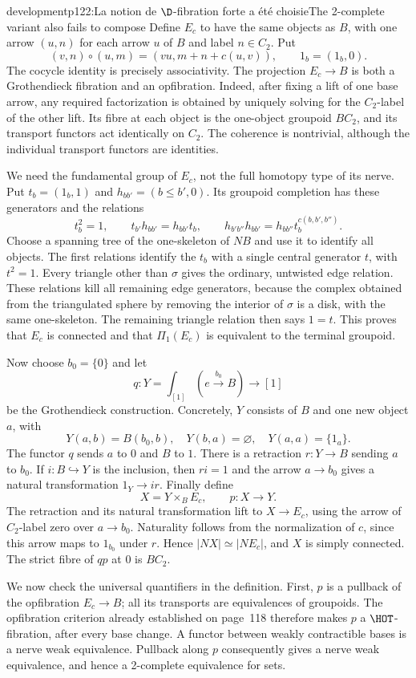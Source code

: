 \begin{dcomment}{development}{p122:La notion de $\D$-fibration forte a été choisie}{The 2-complete variant also fails to compose}
Define $E_c$ to have the same objects as $B$, with one arrow $(u,n)$ for each arrow $u$ of $B$ and label $n\in C_2$. Put
\[
 (v,n)\circ(u,m)=(vu,m+n+c(u,v)),
 \qquad 1_b=(1_b,0).
\]
The cocycle identity is precisely associativity. The projection $E_c\to B$ is both a Grothendieck fibration and an opfibration. Indeed, after fixing a lift of one base arrow, any required factorization is obtained by uniquely solving for the $C_2$-label of the other lift. Its fibre at each object is the one-object groupoid $BC_2$, and its transport functors act identically on $C_2$. The coherence is nontrivial, although the individual transport functors are identities.

We need the fundamental group of $E_c$, not the full homotopy type of its nerve. Put $t_b=(1_b,1)$ and $h_{bb'}=(b\leq b',0)$. Its groupoid completion has these generators and the relations
\[
 t_b^2=1,\qquad t_{b'}h_{bb'}=h_{bb'}t_b,
 \qquad
 h_{b'b''}h_{bb'}=h_{bb''}t_b^{c(b,b',b'')}.
\]
Choose a spanning tree of the one-skeleton of $NB$ and use it to identify all objects. The first relations identify the $t_b$ with a single central generator $t$, with $t^2=1$. Every triangle other than $\sigma$ gives the ordinary, untwisted edge relation. These relations kill all remaining edge generators, because the complex obtained from the triangulated sphere by removing the interior of $\sigma$ is a disk, with the same one-skeleton. The remaining triangle relation then says $1=t$. This proves that $E_c$ is connected and that $\Pi_1(E_c)$ is equivalent to the terminal groupoid.

Now choose $b_0=\{0\}$ and let
\[
 q:Y=\int_{[1]}(e\xrightarrow{b_0}B)\longrightarrow[1]
\]
be the Grothendieck construction. Concretely, $Y$ consists of $B$ and one new object $a$, with
\[
 Y(a,b)=B(b_0,b),\quad Y(b,a)=\varnothing,
 \quad Y(a,a)=\{1_a\}.
\]
The functor $q$ sends $a$ to $0$ and $B$ to $1$. There is a retraction $r:Y\to B$ sending $a$ to $b_0$. If $i:B\hookrightarrow Y$ is the inclusion, then $ri=1$ and the arrow $a\to b_0$ gives a natural transformation $1_Y\to ir$. Finally define
\[
 X=Y\times_B E_c,\qquad p:X\longrightarrow Y.
\]
The retraction and its natural transformation lift to $X\to E_c$, using the arrow of $C_2$-label zero over $a\to b_0$. Naturality follows from the normalization of $c$, since this arrow maps to $1_{b_0}$ under $r$. Hence $|NX|\simeq|NE_c|$, and $X$ is simply connected. The strict fibre of $qp$ at $0$ is $BC_2$.

We now check the universal quantifiers in the definition. First, $p$ is a pullback of the opfibration $E_c\to B$; all its transports are equivalences of groupoids. The opfibration criterion already established on page~118 therefore makes $p$ a $\HOT$-fibration, after every base change. A functor between weakly contractible bases is a nerve weak equivalence. Pullback along $p$ consequently gives a nerve weak equivalence, and hence a 2-complete equivalence for sets.


\end{dcomment}
